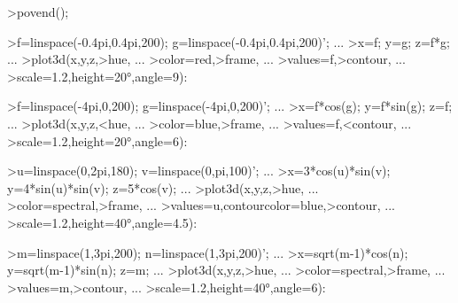 \documentclass{article}
\begin{document}
\begin{eulernotebook}
\begin{eulerprompt}
>povend();
\end{eulerprompt}
\begin{eulercomment}
\end{eulercomment}
\begin{eulerprompt}
>f=linspace(-0.4pi,0.4pi,200); g=linspace(-0.4pi,0.4pi,200)'; ...
>x=f; y=g; z=f*g; ...
>plot3d(x,y,z,>hue, ...
>color=red,>frame, ...
>values=f,>contour, ...
>scale=1.2,height=20°,angle=9):
\end{eulerprompt}
\begin{eulercomment}
\end{eulercomment}
\eulersubheading{}
\begin{eulerprompt}
>f=linspace(-4pi,0,200); g=linspace(-4pi,0,200)'; ...
>x=f*cos(g); y=f*sin(g); z=f; ...
>plot3d(x,y,z,<hue, ...
>color=blue,>frame, ...
>values=f,<contour, ...
>scale=1.2,height=20°,angle=6):
\end{eulerprompt}
\begin{eulercomment}
\end{eulercomment}
\eulersubheading{}
\begin{eulerprompt}
>u=linspace(0,2pi,180); v=linspace(0,pi,100)'; ...
>x=3*cos(u)*sin(v); y=4*sin(u)*sin(v); z=5*cos(v); ...
>plot3d(x,y,z,>hue, ...
>color=spectral,>frame, ...
>values=u,contourcolor=blue,>contour, ...
>scale=1.2,height=40°,angle=4.5):
\end{eulerprompt}
\begin{eulercomment}
\end{eulercomment}
\eulersubheading{}
\begin{eulerprompt}
>m=linspace(1,3pi,200); n=linspace(1,3pi,200)'; ...
>x=sqrt(m-1)*cos(n); y=sqrt(m-1)*sin(n); z=m; ...
>plot3d(x,y,z,>hue, ...
>color=spectral,>frame, ...
>values=m,>contour, ...
>scale=1.2,height=40°,angle=6):
\end{eulerprompt}
\begin{eulercomment}
\end{eulercomment}
\eulersubheading{}
\begin{eulerprompt}

\end{eulerprompt}
\end{eulernotebook}
\end{document}
